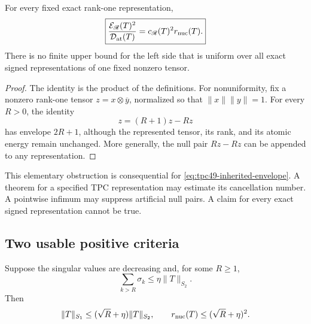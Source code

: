 \begin{proposition}
\label{prop:tpc49-fixed-representation-ledger}
For every fixed exact rank-one representation,
\begin{equation}
 \boxed{
 \frac{\mathcal E_{\mathscr R}(T)^2}{\mathcal D_{\rm at}(T)}
 =c_{\mathscr R}(T)^2r_{\rm nuc}(T).}
 \label{eq:tpc49-fixed-representation-ledger}
\end{equation}
There is no finite upper bound for the left side that is uniform over
all exact signed representations of one fixed nonzero tensor.
\end{proposition}

\begin{proof}
The identity is the product of the definitions.  For nonuniformity,
fix a nonzero rank-one tensor \(z=x\otimes\overline y\), normalized so
that \(\|x\|\|y\|=1\).  For every \(R>0\), the identity
\begin{equation}
 z=(R+1)z-Rz
 \label{eq:tpc49-cancelling-pair}
\end{equation}
has envelope \(2R+1\), although the represented tensor, its rank, and
its atomic energy remain unchanged.  More generally, the null pair
\(Rz-Rz\) can be appended to any representation.
\end{proof}

This elementary obstruction is consequential for
\eqref{eq:tpc49-inherited-envelope}.  A theorem for a specified
TPC representation may estimate its cancellation number.  A pointwise
infimum may suppress artificial null pairs.  A claim for every exact
signed representation cannot be true.

\subsection{Two usable positive criteria}

\begin{corollary}
\label{cor:tpc49-approximate-rank}
Suppose the singular values are decreasing and, for some \(R\ge1\),
\begin{equation}
 \sum_{k>R}\sigma_k\le\eta\|T\|_{S_2}.
 \label{eq:tpc49-nuclear-tail}
\end{equation}
Then
\begin{equation}
 \|T\|_{S_1}
 \le(\sqrt R+\eta)\|T\|_{S_2},
 \qquad
 r_{\rm nuc}(T)\le(\sqrt R+\eta)^2.
 \label{eq:tpc49-approximate-rank-bound}
\end{equation}
\end{corollary}

